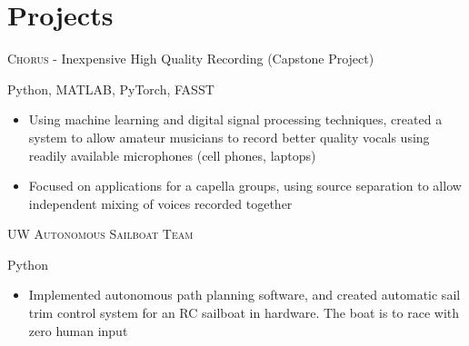 \documentclass[letterpaper,10pt]{article}
\begin{document}
\begin{minipage}[t]{0.60\textwidth}
\section{Projects}
\smallskip
\begin{large}
\textsc{Chorus} - Inexpensive High Quality Recording (Capstone Project) \\
\end{large}
\begin{footnotesize}
Python, MATLAB, PyTorch, FASST
\end{footnotesize}
\smallskip
\begin{itemize}
	\item {Using machine learning and digital signal processing techniques, created a system to allow amateur musicians to record better quality vocals using readily available microphones (cell phones, laptops)}
    \item {Focused on applications for a capella groups, using source separation to allow independent mixing of voices recorded together}
\end{itemize}

\bigskip

\begin{large}
\textsc{UW Autonomous Sailboat Team}\\
\end{large}
\begin{footnotesize}
Python
\end{footnotesize}
\smallskip
\begin{itemize}
	\item {Implemented autonomous path planning software, and created automatic sail trim control system for an RC sailboat in hardware. The boat is to race with zero human input}
\end{itemize}


\end{minipage}
\hfill
\end{document}
